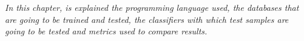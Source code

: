 
\begin{small}
\emph{In this chapter, is explained the programming language used, the databases that are going to be trained and tested, the classifiers with which test samples are going to be tested and metrics used to compare results.}
\end{small}





